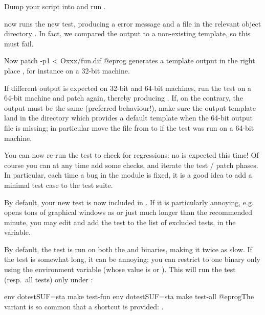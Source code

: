\item Dump your script into  and run .

\item {} now runs the new test, producing a \kbd{[BUG]} error
message and a  file in the relevant object directory .
In fact, we compared the output to a non-existing template, so this must fail.

\item Now
\bprog
  patch -p1 < Oxxx/fun.dif
@eprog\noindent
generates a template output in the right place , for
instance on a 32-bit machine.

\item If different output is expected on 32-bit and 64-bit machines, run the
test on a 64-bit machine and patch again, thereby
producing . If, on the contrary, the output must be the
same (preferred behaviour!), make sure the output template land in the
 directory which provides a default template when the
64-bit output file is missing; in particular move the file from
 to  if the test was run on a 64-bit
machine.

\item You can now re-run the test to check for regressions: no \kbd{[BUG]}
is expected this time! Of course you can at any time add some checks, and
iterate the test / patch phases. In particular, each time a bug in the
 module is fixed, it is a good idea to add a minimal test case to
the test suite.

\item By default, your new test is now included in . If
it is particularly annoying, e.g. opens tons of graphical windows as
 or just much longer than the recommended minute, you
may edit  and add the  test to the list of
excluded tests, in the  variable.

\item By default, the test is run on both the  and 
binaries, making it twice as slow. If the test is somewhat long, it can
be annoying; you can restrict to one binary only using the 
environment variable (whose value is  or ). This will run
the test (resp.~all tests) only under :

\bprog
  env dotestSUF=sta make test-fun
  env dotestSUF=sta make test-all
@eprog\noindent The  variant is so common that a shortcut
is provided: .

